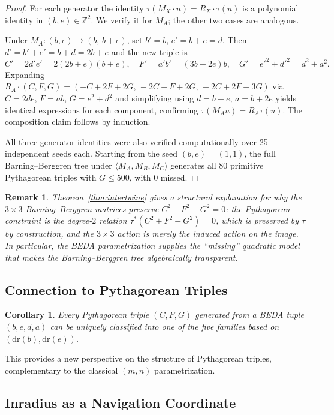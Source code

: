 \documentclass[12pt]{article}
\newtheorem{corollary}[theorem]{Corollary}
\newtheorem{remark}{Remark}
\begin{document}
\begin{proof}
For each generator the identity $\tau(M_X\cdot u)=R_X\cdot\tau(u)$ is a
polynomial identity in $(b,e)\in\mathbb{Z}^2$.  We verify it for $M_A$; the other
two cases are analogous.

Under $M_A:(b,e)\mapsto(b,\,b+e)$, set $b'=b$, $e'=b+e=d$.  Then
$d'=b'+e'=b+d=2b+e$ and the new triple is
\[
  C' = 2d'e' = 2(2b+e)(b+e),\quad
  F' = a'b' = (3b+2e)b,\quad
  G' = {e'}^2+{d'}^2 = d^2+a^2.
\]
Expanding $R_A\cdot(C,F,G) = (-C+2F+2G,\,-2C+F+2G,\,-2C+2F+3G)$ via
$C=2de$, $F=ab$, $G=e^2+d^2$ and simplifying using $d=b+e$, $a=b+2e$
yields identical expressions for each component, confirming $\tau(M_A u)=R_A\tau(u)$.
The composition claim follows by induction.

All three generator identities were also verified computationally over 25
independent seeds each.  Starting from the seed $(b,e)=(1,1)$, the full
Barning--Berggren tree under $\langle M_A,M_B,M_C\rangle$ generates all 80
primitive Pythagorean triples with $G\leq 500$, with 0 missed.
\end{proof}

\begin{remark}
Theorem~\ref{thm:intertwine} gives a structural explanation for why the $3\times 3$
Barning--Berggren matrices preserve $C^2+F^2-G^2=0$: the Pythagorean constraint is
the degree-$2$ relation $\tau^*(C^2+F^2-G^2)=0$, which is preserved by $\tau$
by construction, and the $3\times 3$ action is merely the induced action on the
image.  In particular, the BEDA parametrization supplies the ``missing'' quadratic
model that makes the Barning--Berggren tree algebraically transparent.
\end{remark}

\subsection{Connection to Pythagorean Triples}

\begin{corollary}
Every Pythagorean triple $(C, F, G)$ generated from a BEDA tuple $(b, e, d, a)$ can be uniquely classified into one of the five families based on $(\text{dr}(b), \text{dr}(e))$.
\end{corollary}

This provides a new perspective on the structure of Pythagorean triples, complementary to the classical $(m, n)$ parametrization.

\subsection{Inradius as a Navigation Coordinate}\label{sec:inradius}
\end{document}
